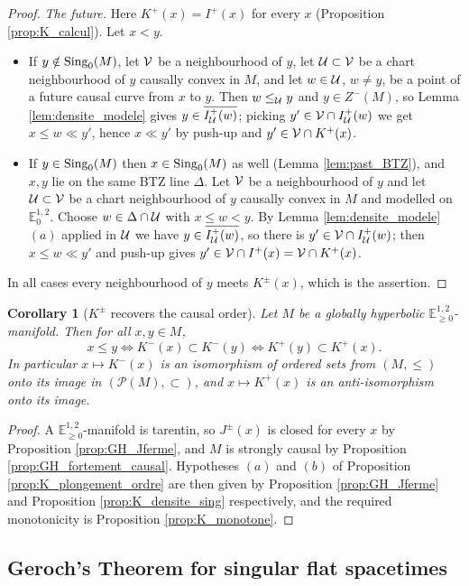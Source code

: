 \documentclass[a4paper,twoside]{article}
\newcommand{\mass}[1]{\mathbb{E}^{1,2}_{#1}}
\newtheorem{cor}[lem]{Corollary}
\begin{document}
\begin{proof}
\emph{The future.} Here $K^+(x)=I^+(x)$ for every $x$ (Proposition \ref{prop:K_calcul}). Let $x<y$.
\begin{itemize}
\item If $y\notin \mathrm{Sing}_0(M)$, let $\mathcal V$ be a neighbourhood of $y$, let $\mathcal{U}\subset \mathcal V$ be a chart
neighbourhood of $y$ causally convex in $M$, and let $w\in \mathcal{U}$, $w\neq y$, be a point of a future
causal curve from $x$ to $y$. Then $w\leq_{\mathcal{U}} y$ and $y\in Z^-(M)$, so Lemma \ref{lem:densite_modele}
gives $y\in \overline{I^+_{\mathcal{U}}(w)}$; picking $y'\in \mathcal V\cap I^+_{\mathcal{U}}(w)$ we get $x\leq w\ll y'$, hence
$x\ll y'$ by push-up and $y'\in \mathcal V\cap K^+(x)$.
\item If $y\in \mathrm{Sing}_0(M)$ then $x\in \mathrm{Sing}_0(M)$ as well (Lemma \ref{lem:past_BTZ}), and $x,y$ lie on
the same BTZ line $\Delta$. Let $\mathcal V$ be a neighbourhood of $y$ and let $\mathcal{U}\subset \mathcal V$ be a chart
neighbourhood of $y$ causally convex in $M$ and modelled on $\mass{0}$. Choose $w\in \Delta\cap \mathcal{U}$
with $x\leq w<y$. By Lemma \ref{lem:densite_modele}$(a)$ applied in $\mathcal{U}$ we have
$y\in \overline{I^+_{\mathcal{U}}(w)}$, so there is $y'\in \mathcal V\cap I^+_{\mathcal{U}}(w)$; then $x\leq w\ll y'$ and push-up
gives $y'\in \mathcal V\cap I^+(x)=\mathcal V\cap K^+(x)$.
\end{itemize}
In all cases every neighbourhood of $y$ meets $K^\pm(x)$, which is the assertion.
\end{proof}

\begin{cor}[$K^\pm$ recovers the causal order]\label{cor:K_ordre}
Let $M$ be a globally hyperbolic $\mass{\geq0}$-manifold. Then for all $x,y\in M$,
$$x\leq y \iff K^-(x)\subset K^-(y) \iff K^+(y)\subset K^+(x).$$
In particular $x\mapsto K^-(x)$ is an isomorphism of ordered sets from $(M,\leq)$ onto its image in
$\left(\mathcal P(M),\subset\right)$, and $x\mapsto K^+(x)$ is an anti-isomorphism onto its image.
\end{cor}
\begin{proof}
A $\mass{\geq0}$-manifold is tarentin, so $J^\pm(x)$ is closed for every $x$ by Proposition
\ref{prop:GH_Jferme}, and $M$ is strongly causal by Proposition \ref{prop:GH_fortement_causal}.
Hypotheses $(a)$ and $(b)$ of Proposition \ref{prop:K_plongement_ordre} are then given by
Proposition \ref{prop:GH_Jferme} and Proposition \ref{prop:K_densite_sing} respectively, and the
required monotonicity is Proposition \ref{prop:K_monotone}.
\end{proof}

\subsection{Geroch's Theorem for singular flat spacetimes}\label{subsec:geroch_sing}
\end{document}
